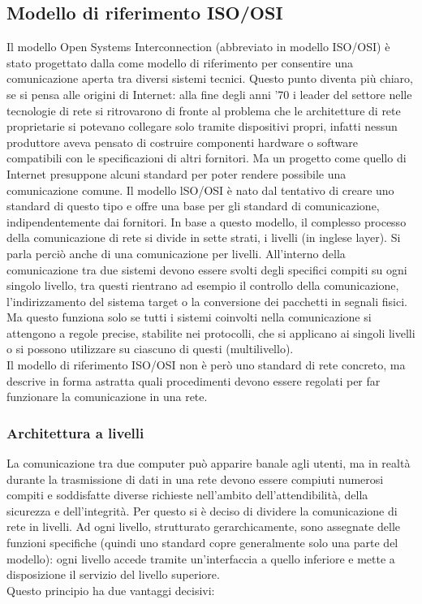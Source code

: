 \documentclass[a4paper,11pt]{article}
\def\sub#1{\subsection{#1}\label{#1}}
\def\subsub#1{\subsubsection{#1}\label{#1}}
\def\vedi#1{\nameref{#1}}
\begin{document}
\sub{Modello di riferimento ISO/OSI}
Il modello Open Systems Interconnection (abbreviato in modello ISO/OSI) è stato progettato dalla \vedi{ISO} come modello di riferimento per consentire una comunicazione aperta tra diversi sistemi tecnici. Questo punto diventa più chiaro, se si pensa alle origini di Internet: alla fine degli anni ’70 i leader del settore nelle tecnologie di rete si ritrovarono di fronte al problema che le architetture di rete proprietarie si potevano collegare solo tramite dispositivi propri, infatti nessun produttore aveva pensato di costruire componenti hardware o software compatibili con le specificazioni di altri fornitori. Ma un progetto come quello di Internet presuppone alcuni standard per poter rendere possibile una comunicazione comune.
Il modello lSO/OSI è nato dal tentativo di creare uno standard di questo tipo e offre una base per gli standard di comunicazione, indipendentemente dai fornitori. In base a questo modello, il complesso processo della comunicazione di rete si divide in sette strati, i livelli (in inglese layer). Si parla perciò anche di una comunicazione per livelli. All’interno della comunicazione tra due sistemi devono essere svolti degli specifici compiti su ogni singolo livello, tra questi rientrano ad esempio il controllo della comunicazione, l’indirizzamento del sistema target o la conversione dei pacchetti in segnali fisici. Ma questo funziona solo se tutti i sistemi coinvolti nella comunicazione si attengono a regole precise, stabilite nei protocolli, che si applicano ai singoli livelli o si possono utilizzare su ciascuno di questi (multilivello).
\\Il modello di riferimento ISO/OSI non è però uno standard di rete concreto, ma descrive in forma astratta quali procedimenti devono essere regolati per far funzionare la comunicazione in una rete.  
\subsub{Architettura a livelli}
La comunicazione tra due computer può apparire banale agli utenti, ma in realtà durante la trasmissione di dati in una rete devono essere compiuti numerosi compiti e soddisfatte diverse richieste nell’ambito dell’attendibilità, della sicurezza e dell’integrità. Per questo si è deciso di dividere la comunicazione di rete in livelli. Ad ogni livello, strutturato gerarchicamente, sono assegnate delle funzioni specifiche (quindi uno standard copre generalmente solo una parte del modello): ogni livello accede tramite un’interfaccia a quello inferiore e mette a disposizione il servizio del livello superiore.
\\Questo principio ha due vantaggi decisivi:
\end{document}
